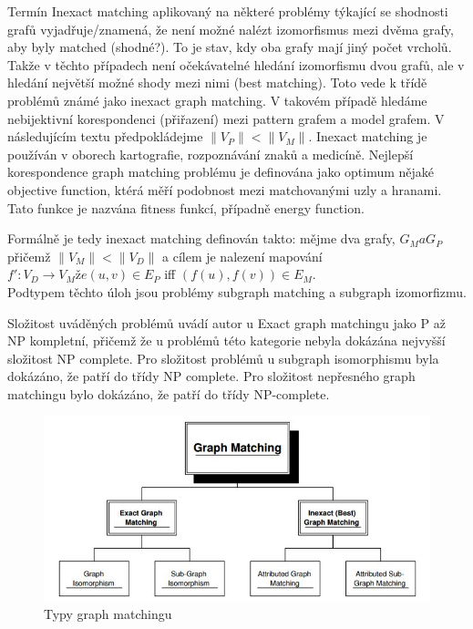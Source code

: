 \documentclass[11pt,twoside,a4paper]{book}
\begin{document}
 Termín Inexact matching aplikovaný na některé problémy týkající se shodnosti grafů vyjadřuje/znamená, že není možné nalézt 
 izomorfismus mezi dvěma grafy, aby byly matched (shodné?). To je stav, kdy oba grafy mají jiný počet vrcholů. Takže v těchto 
 případech není očekávatelné hledání izomorfismu dvou grafů, ale v hledání největší možné shody mezi nimi (best matching). 
 Toto vede k třídě problémů známé jako inexact graph matching. V takovém případě hledáme nebijektivní korespondenci (přiřazení)
 mezi pattern grafem a model grafem. V následujícím textu předpokládejme
 $\|V_P\| < \|V_M\|$. Inexact matching je používán v oborech kartografie,
 rozpoznávání znaků a medicíně. Nejlepší korespondence graph matching problému je definována jako optimum nějaké objective function, ktérá měří podobnost mezi matchovanými uzly a hranami. Tato funkce je nazvána fitness funkcí, případně energy function.

 Formálně je tedy inexact matching definován takto: mějme dva grafy, $G_M a G_P$ přičemž $\| V_M \| < \| V_D\|$ a cílem je nalezení mapování
 $f' : V_D  \rightarrow V_M že (u, v) \in E_P$ iff $(f(u), f(v)) \in E_M$.\\
 
 Podtypem těchto úloh jsou problémy subgraph matching a subgraph izomorfizmu.
 
 Složitost uváděných problémů uvádí autor u Exact graph matchingu jako P až NP kompletní, přičemž že u problémů této kategorie nebyla dokázána nejvyšší složitost 
 NP complete. Pro složitost problémů u subgraph isomorphismu byla dokázáno, že patří do třídy NP complete. Pro složitost nepřesného graph matchingu bylo dokázáno, 
 že patří do třídy NP-complete. 
 
 
 
 \begin{figure}[ht]
\begin{center}
\includegraphics[width=15cm]{figures/graph_matching.jpg}
\caption{Typy graph matchingu}
\label{fig:graph_matching}
\end{center}
\end{figure}
 
\end{document}
